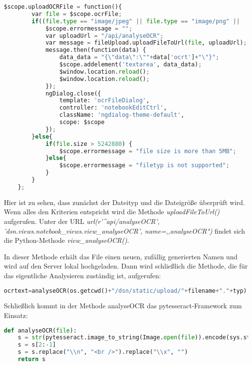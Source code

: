 \begin{lstlisting}[caption={Upload OCR-File}, language=Python]
$scope.uploadOCRFile = function(){
        var file = $scope.ocrFile;
        if((file.type == "image/jpeg" || file.type == "image/png" || 				file.type == "image/gif") && file.size < 5242880) {
            $scope.errormessage = "";
            var uploadUrl = "/api/analyseOCR";
            var message = fileUpload.uploadFileToUrl(file, uploadUrl);
            message.then(function(data) {
                data_data = "{\"data\":\""+data['ocrt']+"\"}";
                $scope.addelement('textarea', data_data);
                $window.location.reload();
                $window.location.reload();
            });
            ngDialog.close({
                template: 'ocrFileDialog',
                controller: 'notebookEditCtrl',
                className: 'ngdialog-theme-default',
                scope: $scope
            });
        }else{
            if(file.size > 5242880) {
                $scope.errormessage = "file size is more than 5MB";
            }else{
                $scope.errormessage = "filetyp is not supported";
            }
        }
    };
\end{lstlisting}

Hier ist zu sehen, dass zunächst der Dateityp und die Dateigröße überprüft wird. Wenn alles den Kriterien entspricht wird die Methode \textit{uploadFileToUrl()} aufgerufen. Unter der URL \textit{url(r'\^{}api/analyseOCR', 'dsn.views.notebook\_views.view\_analyseOCR', name=,,analyseOCR")} findet sich die Python-Methode \textit{view\_analyseOCR()}.

\newpage

In dieser Methode erhält das File einen neuen, zufällig generierten Namen und wird auf den Server lokal hochgeladen. Dann wird schließlich die Methode, die für das eigentliche Analysieren zuständig ist, aufgerufen:

\begin{lstlisting}[caption={OCR-Analyse}, language=Python]
ocrtext=analyseOCR(os.getcwd()+"/dsn/static/upload/"+filename+"."+typ)
\end{lstlisting}

Schließlich kommt in der Methode analyseOCR das pytesseract-Framework zum Einsatz:

\begin{lstlisting}[caption={analyseOCR mittels pytesseract}, language=Python]
def analyseOCR(file):
	s = str(pytesseract.image_to_string(Image.open(file)).encode(sys.stdout.encoding, 	errors='replace'))
    s = s[2:-1]
    s = s.replace("\\n", "<br />").replace("\\x", "")
    return s
\end{lstlisting}

